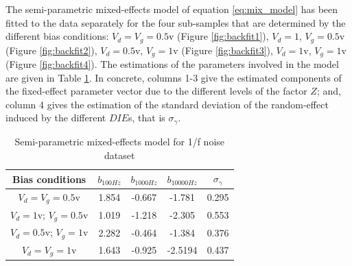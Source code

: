\documentclass[sn-mathphys]{sn-jnl}%
\theoremstyle{thmstyleone}%
\theoremstyle{thmstyletwo}%
\theoremstyle{thmstylethree}%
\begin{document}
The semi-parametric mixed-effects model of equation \eqref{eq:mix_model} has been fitted to the data separately for the four sub-samples that are determined by the different bias conditions: $V_d=V_g=0.5$v (Figure \ref{fig:backfit1}),  $V_d=1$, $V_g=0.5$v (Figure \ref{fig:backfit2}), $V_d=0.5$v, $V_g=1$v (Figure \ref{fig:backfit3}), $V_d=1$v, $V_g=1$v (Figure \ref{fig:backfit4}). The estimations of the parameters involved in the model are given in Table \ref{tab:estim_noise}. In concrete, columns 1-3 give the estimated components of the fixed-effect parameter vector due to the different levels of the factor $Z$; and, column 4 gives the estimation of the standard deviation of the random-effect induced by the different $DIE$s, that is $\sigma_{\gamma}$.
\begin{table}[!t]
	\begin{center}
		\caption{Semi-parametric mixed-effects model for 1/f noise dataset}
		\label{tab:estim_noise}
		\begin{tabular}{|c|c|c|c|c|} \hline
			Bias conditions     &$b_{100Hz}$  &$b_{1000Hz}$   &$b_{10000Hz}$     &$ \sigma_{\gamma}$ \\ \hline
			$V_d=V_g=0.5$v       &1.854  &-0.667 	&-1.781 	 &  0.295  \\ \hline
			$V_d=1$v; $V_g=0.5$v &1.019	 &-1.218  &-2.305 	 &  0.553 \\ \hline
			$V_d=0.5$v; $V_g=1$v &2.282  &-0.464  &-1.384	   &  0.376  \\ \hline
			$V_d=V_g=1$v         &1.643	 &-0.925  &-2.5194	 &  0.437  \\ \hline
		\end{tabular}
	\end{center}
\end{table}
\end{document}
